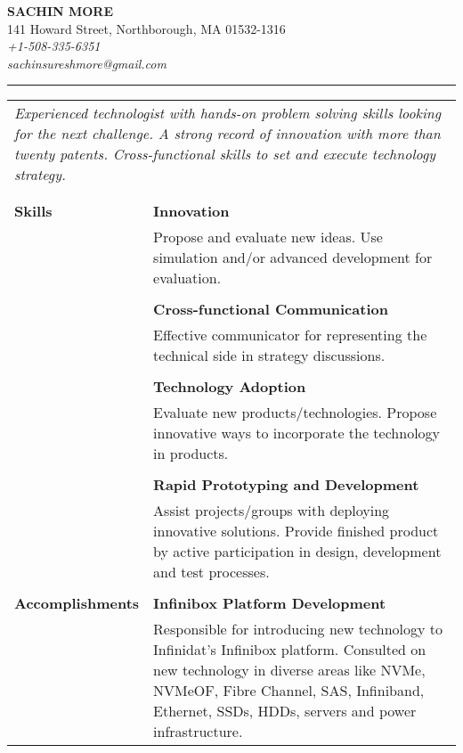 \documentclass[10pt]{article}
\begin{document}
\begin{center}
{\bf \Large SACHIN MORE} \\
141 Howard Street, Northborough, MA 01532-1316 \\
{ \em +1-508-335-6351} \\
{\em sachinsureshmore@gmail.com}
\end{center}
\rule{\textwidth}{1pt}


\begin{longtable}{p{91pt}p{390pt}}
\\\multicolumn{2}{p{493pt}}{\em Experienced technologist with {hands-on problem solving} skills looking for the next challenge.
 A strong record of innovation with {more than twenty patents}. Cross-functional skills to set and execute technology strategy.
}\\
\\\\
{\bf Skills}           & {\bf Innovation}\\
                       & {Propose and evaluate new ideas. Use simulation and/or advanced development
		       for evaluation.}\\
\\
                       & {\bf Cross-functional Communication}\\
                       & {Effective communicator for representing the technical side in strategy discussions.}\\
\\
                       & {\bf Technology Adoption}\\
                       & {Evaluate new products/technologies. 
		       Propose innovative ways to incorporate the technology in products.}\\
\\
                       & {\bf Rapid Prototyping and Development}\\
                       & {Assist projects/groups with deploying innovative solutions. Provide finished
		       product by active participation in design, development and test processes.}\\
\\
{\bf Accomplishments}  & {\bf Infinibox Platform Development}\\
                       & {Responsible for introducing new technology to Infinidat's Infinibox platform. Consulted on new technology
                       in diverse areas like NVMe, NVMeOF, Fibre Channel, SAS, Infiniband, Ethernet, SSDs, HDDs, servers and power infrastructure.}\\

\end{longtable}
\end{document}
